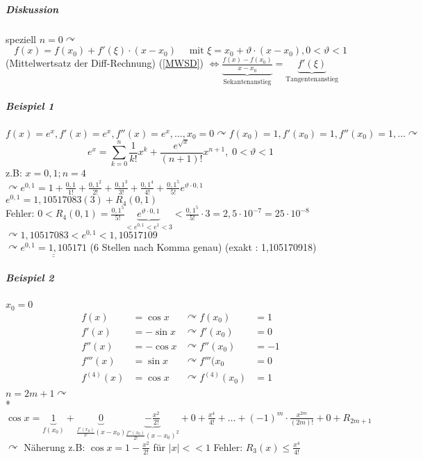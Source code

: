 \documentclass[a4paper]{scrartcl}
\begin{document}
\subparagraph{Diskussion} speziell $n=0 \curvearrowright$
\begin{equation}\label{MWSD}
f(x) = f(x_0) + f'(\xi) \cdot (x-x_0) \quad \text{ mit } \xi = x_0 + \vartheta \cdot (x-x_0),0<\vartheta <1
\end{equation} (Mittelwertsatz der Diff-Rechnung)
(\ref{MWSD}) $ \Leftrightarrow \underbrace{\frac{f(x)-f(x_0)}{x-x_0}}_{\text{Sekantenanstieg}} = \underbrace{f'(\xi)}_{\text{Tangentenanstieg}}$

\subparagraph{Beispiel 1} $f(x) = e^x, f'(x) = e^x, f''(x) = e^x, \dots, x_0 = 0 \curvearrowright f(x_0) = 1, f'(x_0) = 1, f''(x_0) = 1, \dots \curvearrowright$
\[e^x= \sum\limits_{k=0}^{n} \frac{1}{k!} x^k + \frac{e^{\sqrt{x}}}{(n+1)!} x^{n+1}, \; 0 < \vartheta < 1\]
z.B: $x=0,1; n=4$\\
$\curvearrowright e^{0,1} = 1 + \frac{0,1}{1!} + \frac{0,1^2}{2!} + \frac{0,1^3}{3!} + \frac{0,1^4}{4!} + \frac{0,1^5}{5!} e^{\vartheta \cdot 0,1}$\\
$e^{0,1} = 1,10517083(3) + R_4(0,1)$\\
Fehler: $0< R_4(0,1) = \frac{0,1^5}{5!} \underbrace{e^{\vartheta \cdot 0,1}}_{< e^{0,1} < e^1 < 3} < \frac{0,1^5}{5!} \cdot 3 = 2,5 \cdot 10^{-7} = 25 \cdot 10^{-8}$\\
$\curvearrowright 1,10517083 < e^{0,1} < 1,10517109$\\
$\curvearrowright \underline{\underline{ e^{0,1} = 1,105171}}$ (6 Stellen nach Komma genau) (exakt : 1,105170918)

\subparagraph{Beispiel 2}$x_0 = 0$ 
\begin{align*}
f(x) &= \cos{x} &\curvearrowright f(x_0) &= 1\\
f'(x) &= -\sin{x} &\curvearrowright f'(x_0) &= 0\\
f''(x) &= -\cos{x} &\curvearrowright f''(x_0) &= -1\\
f'''(x) &= \sin{x} &\curvearrowright f'''(x_0 &= 0\\
f^{(4)}(x) &= \cos{x} &\curvearrowright f^{(4)} (x_0) &= 1\\
\end{align*}
$n=2m+1 \curvearrowright$\\*
$\cos{x} = \underbrace{1}_{f(x_0)} + \underbrace{0}_{\frac{f'(x_0)}{1!} (x-x_0)} \underbrace{- \frac{x^2}{2!}}_{\frac{f''(x_0)}{2!} (x-x_0)^2} + 0 + \frac{x^4}{4!} + \dots + (-1)^m \cdot \frac{x^{2m}}{(2m)!} + 0 + R_{2m+1}$\\
$\curvearrowright$ Näherung z.B: $\cos{x} = 1 - \frac{x^2}{2!}$ für $\lvert x \rvert << 1$ Fehler: $R_3(x) \leq \frac{x^4}{4!}$\\
\end{document}
